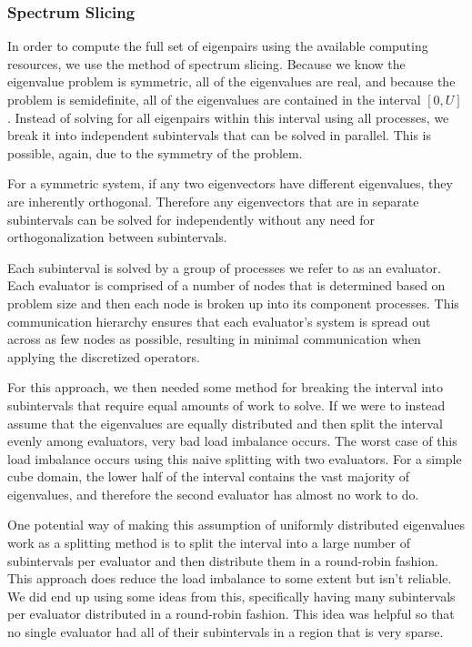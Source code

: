 \subsubsection{Spectrum Slicing}

In order to compute the full set of eigenpairs using the available computing resources, we use the method of spectrum slicing. Because we know the eigenvalue problem is symmetric, all of the eigenvalues are real, and because the problem is semidefinite, all of the eigenvalues are contained in the interval $[0,U]$. Instead of solving for all eigenpairs within this interval using all processes, we break it into independent subintervals that can be solved in parallel. This is possible, again, due to the symmetry of the problem. 

For a symmetric system, if any two eigenvectors have different eigenvalues, they are inherently orthogonal. Therefore any eigenvectors that are in separate subintervals can be solved for independently without any need for orthogonalization between subintervals.

Each subinterval is solved by a group of processes we refer to as an evaluator. Each evaluator is comprised of a number of nodes that is determined based on problem size and then each node is broken up into its component processes. This communication hierarchy ensures that each evaluator's system is spread out across as few nodes as possible, resulting in minimal communication when applying the discretized operators.

For this approach, we then needed some method for breaking the interval into subintervals that require equal amounts of work to solve. If we were to instead assume that the eigenvalues are equally distributed and then split the interval evenly among evaluators, very bad load imbalance occurs. The worst case of this load imbalance occurs using this naive splitting with two evaluators. For a simple cube domain, the lower half of the interval contains the vast majority of eigenvalues, and therefore the second evaluator has almost no work to do.

One potential way of making this assumption of uniformly distributed eigenvalues work as a splitting method is to split the interval into a large number of subintervals per evaluator and then distribute them in a round-robin fashion. This approach does reduce the load imbalance to some extent but isn't reliable. We did end up using some ideas from this, specifically having many subintervals per evaluator distributed in a round-robin fashion. This idea was helpful so that no single evaluator had all of their subintervals in a region that is very sparse.

